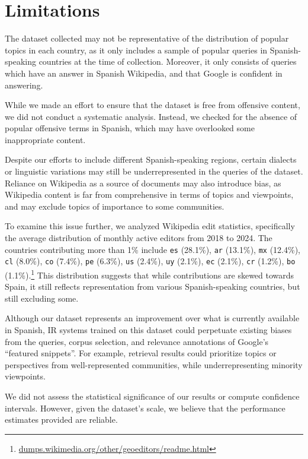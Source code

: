 \documentclass[11pt]{article}
\begin{document}
\section*{Limitations}

The dataset collected may not be representative of the distribution of popular topics in each country, as it only includes a sample of popular queries in Spanish-speaking countries at the time of collection. Moreover, it only consists of queries which have an answer in Spanish Wikipedia, and that Google is confident in answering.

While we made an effort to ensure that the dataset is free from offensive content, we did not conduct a systematic analysis. Instead, we checked for the absence of popular offensive terms in Spanish, which may have overlooked some inappropriate content.

Despite our efforts to include different Spanish-speaking regions, certain dialects or linguistic variations may still be underrepresented in the queries of the dataset. Reliance on Wikipedia as a source of documents may also introduce bias, as Wikipedia content is far from comprehensive in terms of topics and viewpoints, and may exclude topics of importance to some communities.

To examine this issue further, we analyzed Wikipedia edit statistics, specifically the average distribution of monthly active editors from 2018 to 2024. The countries contributing more than 1\% include \texttt{es} (28.1\%), \texttt{ar} (13.1\%), \texttt{mx} (12.4\%), \texttt{cl} (8.0\%), \texttt{co} (7.4\%), \texttt{pe} (6.3\%), \texttt{us} (2.4\%), \texttt{uy} (2.1\%), \texttt{ec} (2.1\%), \texttt{cr} (1.2\%), \texttt{bo} (1.1\%).\footnote{\href{https://dumps.wikimedia.org/other/geoeditors/readme.html}{dumps.wikimedia.org/other/geoeditors/readme.html}} This distribution suggests that while contributions are skewed towards Spain, it still reflects representation from various Spanish-speaking countries, but still excluding some.

Although our dataset represents an improvement over what is currently available in Spanish, IR systems trained on this dataset could perpetuate existing biases from the queries, corpus selection, and relevance annotations of Google's ``featured snippets''. For example, retrieval results could prioritize topics or perspectives from well-represented communities, while underrepresenting minority viewpoints.

We did not assess the statistical significance of our results or compute confidence intervals. However, given the dataset's scale, we believe that the performance estimates provided are reliable.
\end{document}
